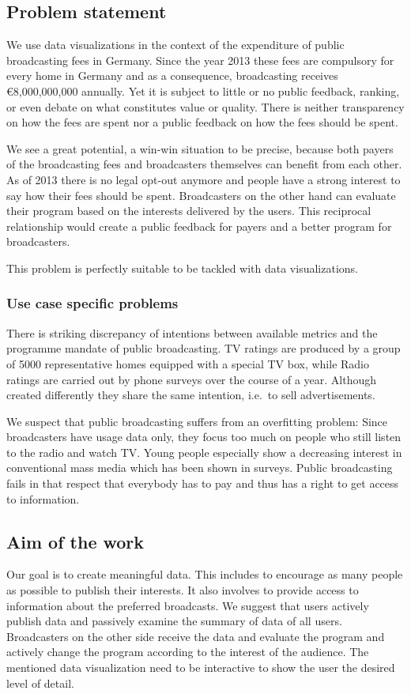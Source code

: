 \documentclass{article}
\begin{document}
\subsection{Problem statement}

We use data visualizations in the context of the expenditure of public broadcasting fees in Germany.
Since the year 2013 these fees are compulsory for every home in Germany and as a consequence, broadcasting receives €8,000,000,000 annually.
Yet it is subject to little or no public feedback, ranking, or even debate on what constitutes value or quality.
There is neither transparency on how the fees are spent nor a public feedback on how the fees should be spent.

We see a great potential, a win-win situation to be precise, because both payers of the broadcasting fees and broadcasters themselves can benefit from each other.
As of 2013 there is no legal opt-out anymore and people have a strong interest to say how their fees should be spent.
Broadcasters on the other hand can evaluate their program based on the interests delivered by the users.
This reciprocal relationship would create a public feedback for payers and a better program for broadcasters.

This problem is perfectly suitable to be tackled with data visualizations.

\subsubsection{Use case specific problems}
There is striking discrepancy of intentions between available metrics and the programme mandate of public broadcasting.
TV ratings are produced by a group of 5000 representative homes equipped with a special TV box, while Radio ratings are carried out by phone surveys over the course of a year.
Although created differently they share the same intention, i.e.\ to sell advertisements.

We suspect that public broadcasting suffers from an overfitting problem:
Since broadcasters have usage data only, they focus too much on people who still listen to the radio and watch TV.
Young people especially show a decreasing interest in conventional mass media which has been shown in surveys.
Public broadcasting fails in that respect that everybody has to pay and thus has a right to get access to information.


\subsection{Aim of the work}
Our goal is to create meaningful data.
This includes to encourage as many people as possible to publish their interests.
It also involves to provide access to information about the preferred broadcasts.
We suggest that users actively publish data and passively examine the summary of data of all users.
Broadcasters on the other side receive the data and evaluate the program and actively change the program according to the interest of the audience.
The mentioned data visualization need to be interactive to show the user the desired level of detail.
\end{document}
